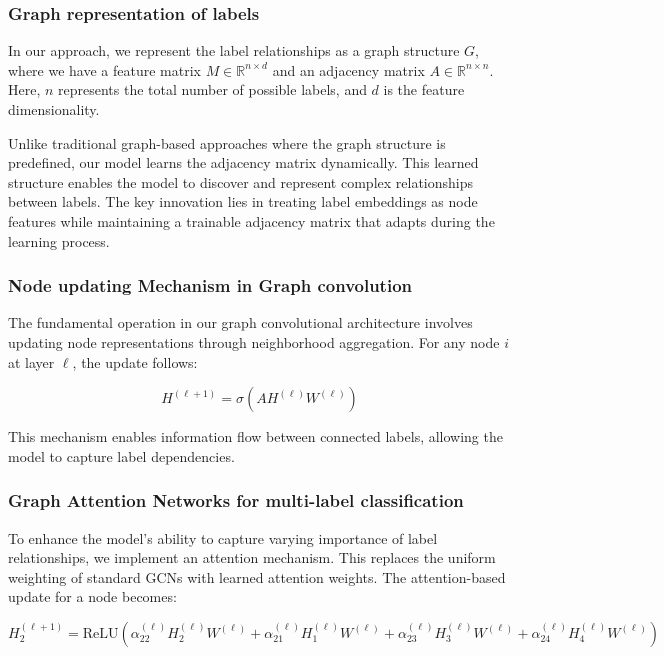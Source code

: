 \documentclass{article}
\begin{document}
\subsubsection{Graph representation of labels}
In our approach, we represent the label relationships as a graph structure $G$, where we have a feature matrix $M \in \mathbb{R}^{n\times d}$ and an adjacency matrix $A \in \mathbb{R}^{n\times n}$. Here, $n$ represents the total number of possible labels, and $d$ is the feature dimensionality.

Unlike traditional graph-based approaches where the graph structure is predefined, our model learns the adjacency matrix dynamically. This learned structure enables the model to discover and represent complex relationships between labels. The key innovation lies in treating label embeddings as node features while maintaining a trainable adjacency matrix that adapts during the learning process.

\subsubsection{Node updating Mechanism in Graph convolution}
The fundamental operation in our graph convolutional architecture involves updating node representations through neighborhood aggregation. For any node $i$ at layer $\ell$, the update follows:

\begin{equation}
H^{(\ell+1)} = \sigma\left(AH^{(\ell)}W^{(\ell)}\right)
\end{equation}

This mechanism enables information flow between connected labels, allowing the model to capture label dependencies.

\subsubsection{Graph Attention Networks for multi-label classification}
To enhance the model's ability to capture varying importance of label relationships, we implement an attention mechanism. This replaces the uniform weighting of standard GCNs with learned attention weights. The attention-based update for a node becomes:

\begin{equation}
H_2^{(\ell+1)} = \text{ReLU}\left(\alpha_{22}^{(\ell)}H_2^{(\ell)}W^{(\ell)} + \alpha_{21}^{(\ell)}H_1^{(\ell)}W^{(\ell)} + \alpha_{23}^{(\ell)}H_3^{(\ell)}W^{(\ell)} + \alpha_{24}^{(\ell)}H_4^{(\ell)}W^{(\ell)}\right)
\end{equation}
\end{document}
